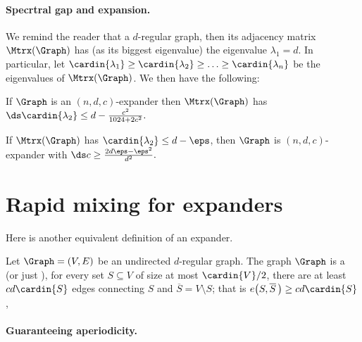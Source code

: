 \paragraph*{Specrtral gap and expansion.}

We remind the reader that a $d$-regular graph, then its adjacency
matrix $\Mtrx(\Graph)$ has (as its biggest eigenvalue) the eigenvalue
$\lambda_1 =d$. In particular, let
$\cardin{\lambda_1} \geq \cardin{\lambda_2} \geq \ldots \geq
\cardin{\lambda_n}$ be the eigenvalues of $\Mtrx(\Graph)$. We then
have the following:

\begin{theorem}
    If $\Graph$ is an $(n,d,c)$-expander then $\Mtrx(\Graph)$ has
    \begin{math}
        \ds%
        \cardin{\lambda_2} \leq d - \frac{c^2}{1024+2c^2}.
    \end{math}
\end{theorem}

\begin{theorem}
    If $\Mtrx(\Graph)$ has $\cardin{\lambda_2} \leq d - \eps$, then
    $\Graph$ is $(n,d,c)$-expander with
    \begin{math}
        \ds
        c \geq \frac{2d \eps - \eps^2}{d^2}.
    \end{math}
\end{theorem}

\section{Rapid mixing for expanders}


Here is another equivalent definition of an expander.
\begin{defn}
    Let $\Graph=(V,E)$ be an undirected $d$-regular graph.  The graph
    $\Graph$ is a
     (or just
    ), for every set
    $S \subseteq V$ of size at most $\cardin{V}/2$, there are at least
    $c d \cardin{S}$ edges connecting $S$ and
    $\overline{S} = V \setminus S$; that is
    $ e\bigl( S, \overline{S} \, \bigr) \geq c d \cardin{S}$,
\end{defn}


\paragraph*{Guaranteeing aperiodicity.}


